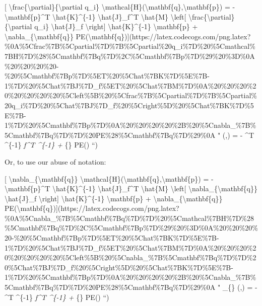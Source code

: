 \documentclass[]{article}
\begin{document}
{[} \textbackslash{}frac\{\textbackslash{}partial\}\{\textbackslash{}partial
q\_i\}
\textbackslash{}mathcal\{H\}(\textbackslash{}mathbf\{q\},\textbackslash{}mathbf\{p\})
= - \textbackslash{}mathbf\{p\}\^{}T \textbackslash{}hat\{K\}\^{}\{-1\}
\textbackslash{}hat\{J\}\_f\^{}T \textbackslash{}hat\{M\}
\textbackslash{}left{[}
\textbackslash{}frac\{\textbackslash{}partial\}\{\textbackslash{}partial q\_i\}
\textbackslash{}hat\{J\}\_f \textbackslash{}right{]}
\textbackslash{}hat\{K\}\^{}\{-1\} \textbackslash{}mathbf\{p\} +
\textbackslash{}nabla\_\{\textbackslash{}mathbf\{q\}\}
PE(\textbackslash{}mathbf\{q\}){]}(https://latex.codecogs.com/png.latex?\%0A\%5Cfrac\%7B\%5Cpartial\%7D\%7B\%5Cpartial\%20q\_i\%7D\%20\%5Cmathcal\%7BH\%7D\%28\%5Cmathbf\%7Bq\%7D\%2C\%5Cmathbf\%7Bp\%7D\%29\%20\%3D\%0A\%20\%20\%20\%20-\%20\%5Cmathbf\%7Bp\%7D\%5ET\%20\%5Chat\%7BK\%7D\%5E\%7B-1\%7D\%20\%5Chat\%7BJ\%7D\_f\%5ET\%20\%5Chat\%7BM\%7D\%0A\%20\%20\%20\%20\%20\%20\%20\%20\%5Cleft\%5B\%20\%5Cfrac\%7B\%5Cpartial\%7D\%7B\%5Cpartial\%20q\_i\%7D\%20\%5Chat\%7BJ\%7D\_f\%20\%5Cright\%5D\%20\%5Chat\%7BK\%7D\%5E\%7B-1\%7D\%20\%5Cmathbf\%7Bp\%7D\%0A\%20\%20\%20\%20\%2B\%20\%5Cnabla\_\%7B\%5Cmathbf\%7Bq\%7D\%7D\%20PE\%28\%5Cmathbf\%7Bq\%7D\%29\%0A
"  (,) = -
\^{}T \^{}\{-1\} \emph{f\^{}T 
 \^{}\{-1\}
 + \nabla}\{\} PE() ``)

Or, to use our abuse of notation:

{[} \textbackslash{}nabla\_\{\textbackslash{}mathbf\{q\}\}
\textbackslash{}mathcal\{H\}(\textbackslash{}mathbf\{q\},\textbackslash{}mathbf\{p\})
= - \textbackslash{}mathbf\{p\}\^{}T \textbackslash{}hat\{K\}\^{}\{-1\}
\textbackslash{}hat\{J\}\_f\^{}T \textbackslash{}hat\{M\}
\textbackslash{}left{[} \textbackslash{}nabla\_\{\textbackslash{}mathbf\{q\}\}
\textbackslash{}hat\{J\}\_f \textbackslash{}right{]}
\textbackslash{}hat\{K\}\^{}\{-1\} \textbackslash{}mathbf\{p\} +
\textbackslash{}nabla\_\{\textbackslash{}mathbf\{q\}\}
PE(\textbackslash{}mathbf\{q\}){]}(https://latex.codecogs.com/png.latex?\%0A\%5Cnabla\_\%7B\%5Cmathbf\%7Bq\%7D\%7D\%20\%5Cmathcal\%7BH\%7D\%28\%5Cmathbf\%7Bq\%7D\%2C\%5Cmathbf\%7Bp\%7D\%29\%20\%3D\%0A\%20\%20\%20\%20-\%20\%5Cmathbf\%7Bp\%7D\%5ET\%20\%5Chat\%7BK\%7D\%5E\%7B-1\%7D\%20\%5Chat\%7BJ\%7D\_f\%5ET\%20\%5Chat\%7BM\%7D\%0A\%20\%20\%20\%20\%20\%20\%20\%20\%5Cleft\%5B\%20\%5Cnabla\_\%7B\%5Cmathbf\%7Bq\%7D\%7D\%20\%5Chat\%7BJ\%7D\_f\%20\%5Cright\%5D\%20\%5Chat\%7BK\%7D\%5E\%7B-1\%7D\%20\%5Cmathbf\%7Bp\%7D\%0A\%20\%20\%20\%20\%2B\%20\%5Cnabla\_\%7B\%5Cmathbf\%7Bq\%7D\%7D\%20PE\%28\%5Cmathbf\%7Bq\%7D\%29\%0A
" \nabla\_\{\} (,) = - \^{}T
\^{}\{-1\} \emph{f\^{}T 
 \^{}\{-1\}  +
\nabla}\{\} PE() ``)
\end{document}
